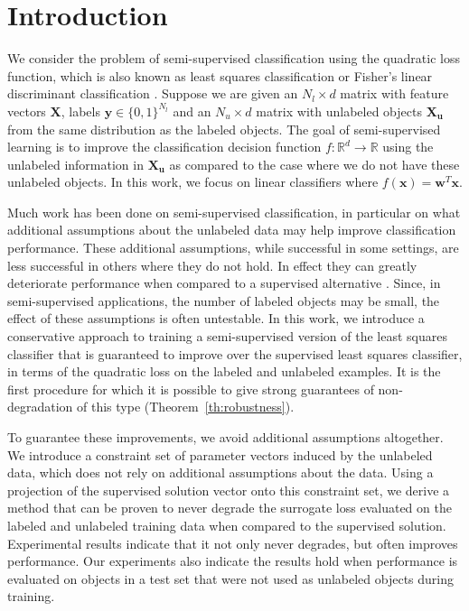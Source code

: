 \documentclass[sts,preprint]{imsart-custom}
\renewcommand{\vec}[1]{\mathbf{#1}}
\begin{document}
\section{Introduction}
\label{Introduction}
We consider the problem of semi-supervised classification using the quadratic loss function, which is also known as least squares classification or Fisher's linear discriminant classification \citep{Hastie2009,Poggio2003}. Suppose we are given an $N_l \times d$ matrix with feature vectors $\vec{X}$, labels $\vec{y} \in \{0,1\}^{N_l}$ and an $N_u \times d$  matrix with unlabeled objects $\vec{X_u}$ from the same distribution as the labeled objects. The goal of semi-supervised learning is to improve the classification decision function $f: \mathbb{R}^d \to \mathbb{R}$ using the unlabeled information in $\vec{X_u}$ as compared to the case where we do not have these unlabeled objects. In this work, we focus on linear classifiers where $f(\vec{x})=\vec{w}^T \vec{x}$. 

Much work has been done on semi-supervised classification, in particular on what additional assumptions about the unlabeled data may help improve classification performance. These additional assumptions, while successful in some settings, are less successful in others where they do not hold. In effect they can greatly deteriorate performance when compared to a supervised alternative \citep{Cozman2006}. Since, in semi-supervised applications, the number of labeled objects may be small, the effect of these assumptions is often untestable. In this work, we introduce a conservative approach to training a semi-supervised version of the least squares classifier that is guaranteed to improve over the supervised least squares classifier, in terms of the quadratic loss on the labeled and unlabeled examples. It is the first procedure for which it is possible to give strong guarantees of non-degradation of this type (Theorem~\ref{th:robustness}).

To guarantee these improvements, we avoid additional assumptions altogether. We introduce a constraint set of parameter vectors induced by the unlabeled data, which does not rely on additional assumptions about the data. Using a projection of the supervised solution vector onto this constraint set, we derive a method that can be proven to never degrade the surrogate loss evaluated on the labeled and unlabeled training data when compared to the supervised solution. Experimental results indicate that it not only never degrades, but often improves performance. Our experiments also indicate the results hold when performance is evaluated on objects in a test set that were not used as unlabeled objects during training.
\end{document}
